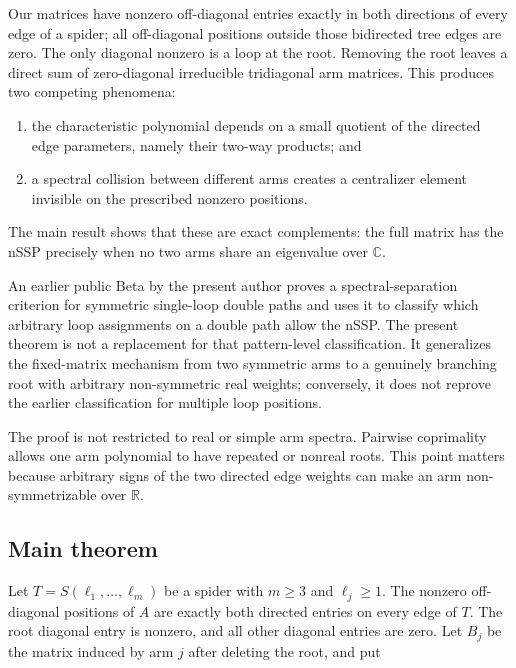 \documentclass[11pt]{article}
\theoremstyle{remark}
\begin{document}
Our matrices have nonzero off-diagonal entries exactly in both directions of every edge of a spider; all off-diagonal positions outside those bidirected tree edges are zero. The only diagonal nonzero is a loop at the root. Removing the root leaves a direct sum of zero-diagonal irreducible tridiagonal arm matrices. This produces two competing phenomena:

\begin{enumerate}
\item the characteristic polynomial depends on a small quotient of the directed edge parameters, namely their two-way products; and
\item a spectral collision between different arms creates a centralizer element invisible on the prescribed nonzero positions.

\end{enumerate}

The main result shows that these are exact complements: the full matrix has the nSSP precisely when no two arms share an eigenvalue over $\mathbb C$.

An earlier public Beta by the present author \cite{ref11} proves a spectral-separation criterion for symmetric single-loop double paths and uses it to classify which arbitrary loop assignments on a double path allow the nSSP. The present theorem is not a replacement for that pattern-level classification. It generalizes the fixed-matrix mechanism from two symmetric arms to a genuinely branching root with arbitrary non-symmetric real weights; conversely, it does not reprove the earlier classification for multiple loop positions.

The proof is not restricted to real or simple arm spectra. Pairwise coprimality allows one arm polynomial to have repeated or nonreal roots. This point matters because arbitrary signs of the two directed edge weights can make an arm non-symmetrizable over $\mathbb R$.

\subsection*{Main theorem}

Let $T=S(\ell_1,\ldots,\ell_m)$ be a spider with $m\ge 3$ and $\ell_j\ge1$. The nonzero off-diagonal positions of $A$ are exactly both directed entries on every edge of $T$. The root diagonal entry is nonzero, and all other diagonal entries are zero. Let $B_j$ be the matrix induced by arm $j$ after deleting the root, and put
\end{document}
